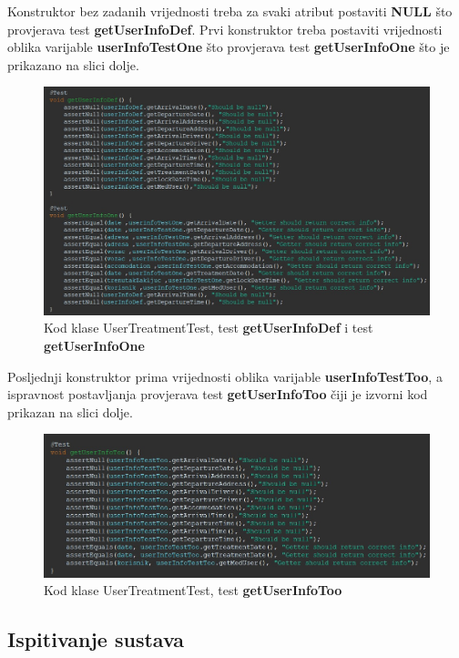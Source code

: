 			Konstruktor bez zadanih vrijednosti treba za svaki atribut postaviti \textbf{NULL} što provjerava test \textbf{getUserInfoDef}. Prvi konstruktor treba postaviti vrijednosti oblika varijable \textbf{userInfoTestOne} što provjerava test \textbf{getUserInfoOne} što je prikazano na slici dolje.
				
			\begin{figure}[H]
				\includegraphics[width=\textwidth]{slike/userTreatmentInfoPtToo.JPG}
				\caption{Kod klase UserTreatmentTest, test \textbf{getUserInfoDef} i test \textbf{getUserInfoOne}}
				\label{UserTreatmentInfoTestPtToo}
			\end{figure}
			
			 Posljednji konstruktor prima vrijednosti oblika varijable  \textbf{userInfoTestToo}, a ispravnost postavljanja provjerava test \textbf{getUserInfoToo} čiji je izvorni kod prikazan na slici dolje.
			
			\begin{figure}[H]
				\includegraphics[width=\textwidth]{slike/userTreatmentInfoPtTree.JPG}
				\caption{Kod klase UserTreatmentTest, test \textbf{getUserInfoToo}}
				\label{UserTreatmentInfoTestPtTree}
			\end{figure}
			
			\subsection{Ispitivanje sustava}
			
